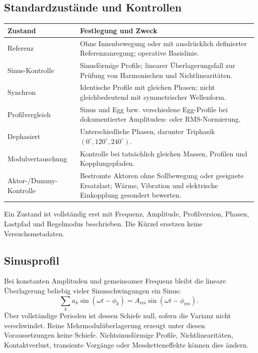 \documentclass[11pt,a4paper]{article}
\begin{document}
\subsection{Standardzustände und Kontrollen}
\begin{longtable}{@{}L{.22\textwidth}L{.73\textwidth}@{}}
\toprule\textbf{Zustand}&\textbf{Festlegung und Zweck}\\\midrule\endhead
Referenz&Ohne Innenbewegung oder mit ausdrücklich definierter Referenzanregung; operative Basislinie.\\
Sinus-Kontrolle&Sinusförmige Profile; linearer Überlagerungsfall zur Prüfung von Harmonischen und Nichtlinearitäten.\\
Synchron&Identische Profile mit gleichen Phasen; nicht gleichbedeutend mit symmetrischer Wellenform.\\
Profilvergleich&Sinus und Egg bzw. verschiedene Egg-Profile bei dokumentierter Amplituden- oder RMS-Normierung.\\
Dephasiert&Unterschiedliche Phasen, darunter Triphasik $(0^\circ,120^\circ,240^\circ)$.\\
Modulvertauschung&Kontrolle bei tatsächlich gleichen Massen, Profilen und Kopplungspfaden.\\
Aktor-/Dummy-Kontrolle&Bestromte Aktoren ohne Sollbewegung oder geeignete Ersatzlast; Wärme, Vibration und elektrische Einkopplung gesondert bewerten.\\
\bottomrule\end{longtable}
Ein Zustand ist vollständig erst mit Frequenz, Amplitude, Profilversion, Phasen, Lastpfad und Regelmodus beschrieben. Die Kürzel ersetzen keine Versuchsmetadaten.

\subsection{Sinusprofil}
Bei konstanten Amplituden und gemeinsamer Frequenz bleibt die lineare Überlagerung beliebig vieler Sinusschwingungen ein Sinus:
\begin{equation}
\sum_k a_k\sin(\omega t-\phi_k)=A_{\mathrm{res}}\sin(\omega t-\phi_{\mathrm{res}}).
\end{equation}
Über vollständige Perioden ist dessen Schiefe null, sofern die Varianz nicht verschwindet. Reine Mehrmodulüberlagerung erzeugt unter diesen Voraussetzungen keine Schiefe. Nichtsinusförmige Profile, Nichtlinearitäten, Kontaktverlust, transiente Vorgänge oder Messketteneffekte können dies ändern.
\end{document}
